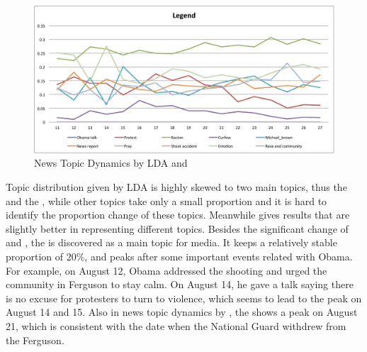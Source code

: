 \begin{figure}[htpb]
\centering
{}
\includegraphics[width=\linewidth]{figures/Legend.pdf}
\caption{News Topic Dynamics by LDA and \stlda}\label{fig:news_topics}
\end{figure}

Topic distribution given by LDA is highly skewed to two main topics, thus the \shootincident and the \raceandcommunity, while other topics take only a small proportion and it is hard to identify the proportion change of these topics. Meanwhile \stlda gives results that are slightly better in representing different topics. Besides the significant change of \shootincident and \raceandcommunity, the \obamatalk is discovered as a main topic for media. It keeps a relatively stable proportion of 20\%, and peaks after some important events related with Obama. For example, on August 12, Obama addressed the shooting and urged the community in Ferguson to stay calm. On August 14, he gave a talk saying there is no excuse for protesters to turn to violence, which seems to lead to the peak on August 14 and 15. Also in news topic dynamics by \stlda, the \protest shows a peak on August 21, which is consistent with the date when the National Guard withdrew from the Ferguson.

